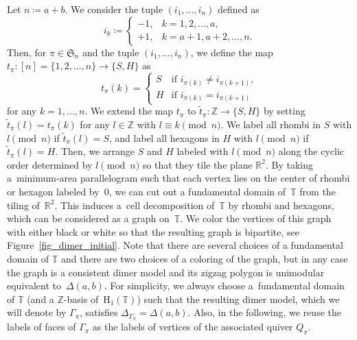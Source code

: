 \documentclass[10pt,a4paper]{amsart}
\numberwithin{equation}{section}
\theoremstyle{definition}
\newcommand{\ZZ}{\mathbb{Z}}
\newcommand{\RR}{\mathbb{R}}
\newcommand{\TT}{\mathbb{T}}
\newcommand{\rmH}{\mathrm{H}}
\newcommand{\fkS}{\mathfrak{S}}
\newcommand{\perm}{\pi}
\begin{document}
Let $n\coloneqq a+b$. We consider the tuple $(i_1, \dots, i_n)$ defined as
\begin{equation*}%
i_k\coloneqq\begin{cases}
-1,& k=1, 2, \dots, a, \\
+1,& k=a+1, a+2, \dots, n.
\end{cases}
\end{equation*}
Then, for $\perm\in\fkS_n$ and the tuple $(i_1, \dots, i_n)$, we define the map $t_\perm\colon [n]=\{1,2,\dots,n\}\rightarrow \{S, H\}$ as
\begin{equation}\label{eq_map_SH}
t_\perm(k)=
\begin{cases}
S & \text{if $i_{\perm(k)}\neq i_{\perm(k+1)}$},\\
H & \text{if $i_{\perm(k)}= i_{\perm(k+1)}$}
\end{cases}
\end{equation}
for any $k=1,\dots, n$.
We extend the map $t_\perm$ to $\widetilde{t}_\perm\colon \ZZ\rightarrow \{S, H\}$ by setting
$\widetilde{t}_\perm(l)=t_\perm(k)$ for any $l\in \ZZ$ with $l \equiv k \pmod n$.
We label all rhombi in $S$ with $l \pmod n$ if $\widetilde{t}_\perm(l)=S$,
and label all hexagons in $H$ with $l \pmod n$ if $\widetilde{t}_\perm(l)=H$.
Then, we arrange $S$ and $H$ labeled with $l \pmod n$ along the cyclic order determined by $l \pmod n$ so that they tile the plane $\RR^2$.
By taking a~minimum-area parallelogram such that each vertex lies on the center of rhombi or hexagon labeled by~$0$,
we can cut out a fundamental domain of~$\TT$ from the tiling of~$\RR^2$.
This induces a~cell decomposition of~$\TT$ by rhombi and hexagons, which can be considered as a graph on~$\TT$.
We color the vertices of this graph with either black or white so that the resulting graph is bipartite, see Figure~\ref{fig_dimer_initial}.
Note that there are several choices of a fundamental domain of $\TT$ and there are two choices of a coloring of the graph, but in any case
the graph is a consistent dimer model and its zigzag polygon is unimodular equivalent to~$\Delta(a,b)$.
For simplicity, we always choose a~fundamental domain of $\TT$ (and a $\ZZ$-basis of~$\rmH_1(\TT)$)
such that the resulting dimer model, which we will denote by $\Gamma_\perm$, satisfies $\Delta_{\Gamma_\perm}=\Delta(a,b)$.
Also, in the following, we reuse the labels of faces of $\Gamma_\perm$ as the labels of vertices of the associated quiver $Q_\perm$.
\end{document}
